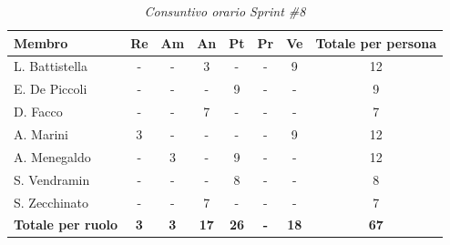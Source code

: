 ﻿\documentclass[a4paper, 10pt, colorlinks=true, linkcolor=black, urlcolor=blue, citecolor=blue, hidelinks]{article}
\renewcommand{\arraystretch}{1.2}
\begin{document}
\begin{table}[H]
    \centering
    \renewcommand{\arraystretch}{1.4}
    \begin{tabular}{|l|c|c|c|c|c|c|c|}
        \hline
        \rowcolor{bluBitless!15}
        \textbf{Membro} & \textbf{Re} & \textbf{Am} & \textbf{An} & \textbf{Pt} & \textbf{Pr} & \textbf{Ve} & \textbf{Totale per persona} \\
        \hline
        L. Battistella & - & - & 3 & - & - & 9 & 12 \\ \hline
        E. De Piccoli & - & - & - & 9 & - & - & 9 \\ \hline
        D. Facco & - & - & 7 & - & - & - & 7 \\ \hline
        A. Marini & 3 & - & - & - & - & 9 & 12 \\ \hline
        A. Menegaldo & - & 3 & - & 9 & - & - & 12 \\ \hline
        S. Vendramin & - & - & - & 8 & - & - & 8 \\ \hline
        S. Zecchinato & - & - & 7 & - & - & - & 7 \\ \hline
        \rowcolor{bluBitless!8}
        \textbf{Totale per ruolo} & \textbf{3} & \textbf{3} & \textbf{17} & \textbf{26} & \textbf{-} & \textbf{18} & \textbf{67} \\
        \hline
    \end{tabular}
    \caption{\textit{Consuntivo orario Sprint \#8}}
\end{table}
\end{document}
